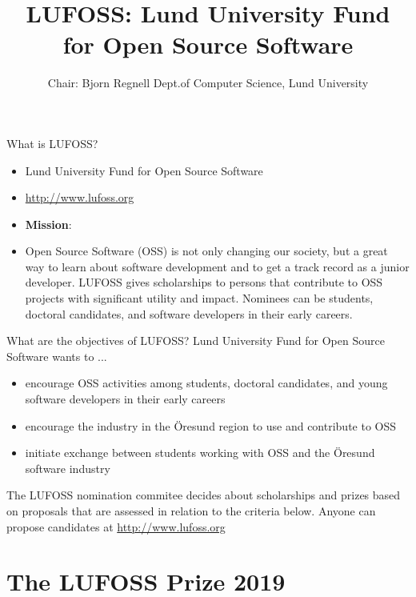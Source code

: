 \documentclass[aspectratio=169]{beamer}
\title[LUFOSS]{LUFOSS: \vspace{0.25em}\newline \fontsize{16}{25}\selectfont Lund University Fund for Open Source Software }
\author[www.lufoss.org]{%
  Chair: Bjorn Regnell\newline
  Dept.\@ of Computer Science, Lund University}
\newcommand{\TitleSlide}{\begin{frame}[plain]\titlepage\end{frame}}
\newcommand{\Section}[1]{\titleimagecolor{red}\section{#1}}
\newenvironment{Slide}[1]%
  {\begin{frame}[environment=Slide]{#1}}
  {\end{frame}}%
\begin{document}
\TitleSlide


\begin{Slide}{What is LUFOSS?}
\begin{itemize}
    \item Lund University Fund for Open Source Software
    \item \url{http://www.lufoss.org}
    \item \textbf{Mission}:
    \item[] Open Source Software (OSS) is not only changing our society, but a great way to learn about software development and to get a track record as a junior developer. LUFOSS gives scholarships to persons that contribute to OSS projects with significant utility and impact. Nominees can be students, doctoral candidates, and software developers in their early careers.
\end{itemize}
\end{Slide}

\begin{Slide}{What are the objectives of LUFOSS?}
  Lund University Fund for Open Source Software wants to ...
      \begin{itemize}
        \item encourage OSS activities among students, doctoral candidates, and young software developers in their early careers
        \item  encourage the industry in the Öresund region to use and contribute to OSS
        \item  initiate exchange between students working with OSS and the Öresund software industry
    \end{itemize}
    The LUFOSS nomination commitee decides about scholarships and prizes based on proposals that are assessed in relation to the criteria below. Anyone can propose candidates at \url{http://www.lufoss.org}  
  \end{Slide}
  


\Section{The LUFOSS Prize 2019}
\end{document}
